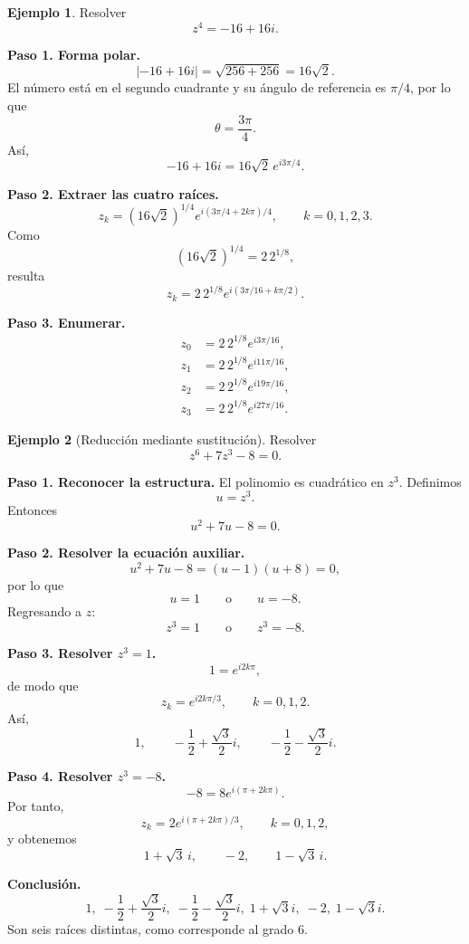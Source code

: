 \documentclass[12pt]{article}
\theoremstyle{definition}
\newtheorem{ejemplo}{Ejemplo}[section]
\theoremstyle{remark}
\begin{document}
\begin{ejemplo}
Resolver
\[
z^4=-16+16i.
\]

\textbf{Paso 1. Forma polar.}
\[
|-16+16i|=\sqrt{256+256}=16\sqrt2.
\]
El número está en el segundo cuadrante y su ángulo de referencia es $\pi/4$,
por lo que
\[
\theta=\frac{3\pi}{4}.
\]
Así,
\[
-16+16i=16\sqrt2\,e^{i3\pi/4}.
\]

\textbf{Paso 2. Extraer las cuatro raíces.}
\[
z_k=(16\sqrt2)^{1/4}
e^{i(3\pi/4+2k\pi)/4},
\qquad k=0,1,2,3.
\]
Como
\[
(16\sqrt2)^{1/4}=2\,2^{1/8},
\]
resulta
\[
z_k=2\,2^{1/8}e^{i(3\pi/16+k\pi/2)}.
\]

\textbf{Paso 3. Enumerar.}
\[
\boxed{
\begin{aligned}
z_0&=2\,2^{1/8}e^{i3\pi/16},\\
z_1&=2\,2^{1/8}e^{i11\pi/16},\\
z_2&=2\,2^{1/8}e^{i19\pi/16},\\
z_3&=2\,2^{1/8}e^{i27\pi/16}.
\end{aligned}}
\]
\end{ejemplo}

\begin{ejemplo}[Reducción mediante sustitución]
Resolver
\[
z^6+7z^3-8=0.
\]

\textbf{Paso 1. Reconocer la estructura.}
El polinomio es cuadrático en $z^3$. Definimos
\[
u=z^3.
\]
Entonces
\[
u^2+7u-8=0.
\]

\textbf{Paso 2. Resolver la ecuación auxiliar.}
\[
u^2+7u-8=(u-1)(u+8)=0,
\]
por lo que
\[
u=1\qquad\text{o}\qquad u=-8.
\]
Regresando a $z$:
\[
z^3=1
\qquad\text{o}\qquad
z^3=-8.
\]

\textbf{Paso 3. Resolver $z^3=1$.}
\[
1=e^{i2k\pi},
\]
de modo que
\[
z_k=e^{i2k\pi/3},\qquad k=0,1,2.
\]
Así,
\[
1,\qquad
-\frac12+\frac{\sqrt3}{2}i,\qquad
-\frac12-\frac{\sqrt3}{2}i.
\]

\textbf{Paso 4. Resolver $z^3=-8$.}
\[
-8=8e^{i(\pi+2k\pi)}.
\]
Por tanto,
\[
z_k=2e^{i(\pi+2k\pi)/3},\qquad k=0,1,2,
\]
y obtenemos
\[
1+\sqrt3\,i,\qquad -2,\qquad 1-\sqrt3\,i.
\]

\textbf{Conclusión.}
\[
\boxed{
1,\;
-\frac12+\frac{\sqrt3}{2}i,\;
-\frac12-\frac{\sqrt3}{2}i,\;
1+\sqrt3 i,\;
-2,\;
1-\sqrt3 i.
}
\]
Son seis raíces distintas, como corresponde al grado $6$.
\end{ejemplo}
\end{document}
